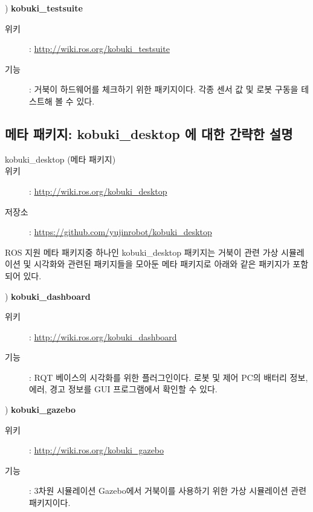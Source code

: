 \vspace{\baselineskip}
\noindent{}
\thenum) \textbf{kobuki\_testsuite}
\begin{description}
\item[위키]: \url{http://wiki.ros.org/kobuki_testsuite}
\item[기능]: 거북이 하드웨어를 체크하기 위한 패키지이다. 각종 센서 값 및 로봇 구동을 테스트해 볼 수 있다.
\end{description}

\subsection{메타 패키지: kobuki\_desktop 에 대한 간략한 설명}

\vspace{\baselineskip}
\begin{description}
\item[kobuki\_desktop (메타 패키지)]
\item[위키]: \url{http://wiki.ros.org/kobuki_desktop}
\item[저장소]: \url{https://github.com/yujinrobot/kobuki_desktop}
\end{description}

\vspace{\baselineskip}
\noindent
ROS 지원 메타 패키지중 하나인 kobuki\_desktop 패키지는 거북이 관련 가상 시뮬레이션 및 시각화와 관련된 패키지들을 모아둔 메타 패키지로 아래와 같은 패키지가 포함되어 있다.

\setcounter{num}{0}

\vspace{\baselineskip}
\noindent{}
\thenum) \textbf{kobuki\_dashboard}
\begin{description}
\item[위키]: \url{http://wiki.ros.org/kobuki_dashboard}
\item[기능]: RQT 베이스의 시각화를 위한 플러그인이다. 로봇 및 제어 PC의 배터리 정보, 에러, 경고 정보를 GUI 프로그램에서 확인할 수 있다.
\end{description}

\vspace{\baselineskip}
\noindent{}
\thenum) \textbf{kobuki\_gazebo}
\begin{description}
\item[위키]: \url{http://wiki.ros.org/kobuki_gazebo}
\item[기능]: 3차원 시뮬레이션 Gazebo에서 거북이를 사용하기 위한 가상 시뮬레이션 관련 패키지이다.
\end{description}

